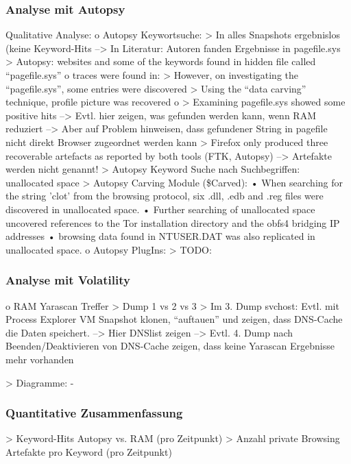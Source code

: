 \subsubsection*{Analyse mit Autopsy}
Qualitative Analyse:
	o	Autopsy Keywortsuche: 
		>	In alles Snapshots ergebnislos (keine Keyword-Hits
		-->	In Literatur: Autoren fanden Ergebnisse in pagefile.sys 
			> Autopsy: websites and some of the keywords found in hidden file called “pagefile.sys” \cite{Mahlous.2020}
			o \cite{Montasari.2015} traces were found in: 
				> However, on investigating the “pagefile.sys”, some entries were discovered
				> Using the “data carving” technique, profile picture was recovered
			o \cite{Said.2011} 
				> Examining pagefile.sys showed some positive hits 			
		--> Evtl. hier zeigen, was gefunden werden kann, wenn RAM reduziert
		--> Aber auf Problem hinweisen, dass gefundener String in pagefile nicht direkt Browser zugeordnet werden kann
		> \cite{Gabet.2018}	Firefox only produced three recoverable artefacts as reported by both tools (FTK, Autopsy) --> Artefakte werden nicht genannt!
		> \cite{Muir.2019} Autopsy Keyword Suche nach Suchbegriffen: unallocated space
		> Autopsy Carving Module (\$Carved): \cite{Muir.2019}
			•	When searching for the string ’clot’ from the browsing protocol, six .dll, .edb and .reg files were discovered in unallocated space.
			•	Further searching of unallocated space uncovered references to the Tor installation directory and the obfs4 bridging IP addresses
			•	browsing data found in NTUSER.DAT was also replicated in unallocated space.
	o	Autopsy PlugIns:
		>	TODO:

\subsubsection*{Analyse mit Volatility}
o	RAM Yarascan Treffer
	>	Dump 1 vs 2 vs 3 
	>	Im 3. Dump svchost: Evtl. mit Process Explorer VM Snapshot klonen, “auftauen” und zeigen, dass DNS-Cache die Daten speichert. 
	-->	Hier DNSlist zeigen
	-->	Evtl. 4. Dump nach Beenden/Deaktivieren von DNS-Cache zeigen, dass keine Yarascan Ergebnisse mehr vorhanden

	> Diagramme:
		- 

		
\subsubsection*{Quantitative Zusammenfassung}
>	Keyword-Hits Autopsy vs. RAM (pro Zeitpunkt)
>	Anzahl private Browsing Artefakte pro Keyword (pro Zeitpunkt)


